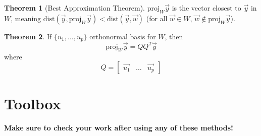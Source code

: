 \documentclass[a4paper,12pt]{article}
\theoremstyle{definition}
\newtheorem{theorem}{Theorem}
\theoremstyle{definition}
\newcommand{\finitevecs}[2]{#1_1,\ldots,#1_#2}
\newcommand{\finitevecsset}[2]{\{\finitevecs{#1}{#2}\}}
\begin{document}
	\begin{theorem}[Best Approximation Theorem]
		\label{thm:best-approx-thm}
		$\text{proj}_W\vec{y}$ is the vector closest to $\vec{y}$ in $W$, meaning $\text{dist}(\vec{y}, \text{proj}_W\vec{y}) < \text{dist}(\vec{y}, \vec{w})$ (for all $\vec{w} \in W$, $\vec{w} \notin \text{proj}_W\vec{y}$).
	\end{theorem}
	
	\begin{theorem}
		\label{thm:orthonormal-basis-proj-thm}
		If $\finitevecsset{u}{p}$ orthonormal basis for $W$, then \begin{equation*}
			\text{proj}_W\vec{y} = QQ^T\vec{y}
		\end{equation*}
		where
		\begin{equation*}
			Q =
			\begin{bmatrix}
				\vec{u_1} & \ldots & \vec{u_p}
			\end{bmatrix}
		\end{equation*}
	\end{theorem}
	\newpage
	
	\section{Toolbox}
	\textbf{Make sure to check your work after using any of these methods!}
	
\end{document}
